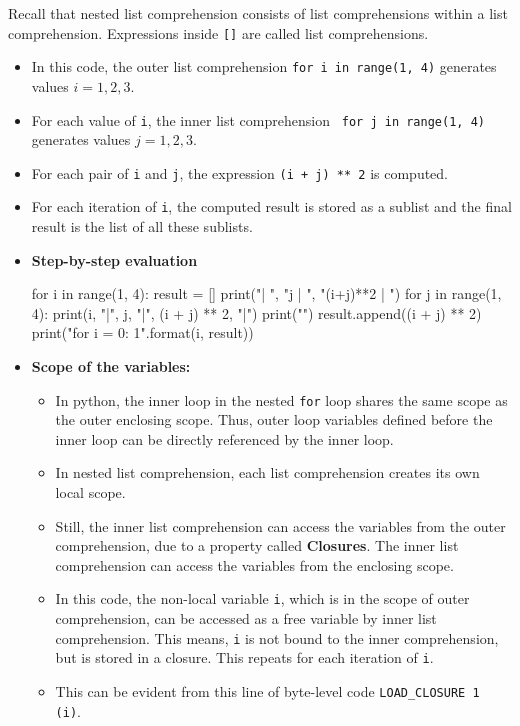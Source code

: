 \documentclass[10pt]{extarticle}
\begin{document}
Recall that nested list comprehension consists of list comprehensions within a list comprehension. Expressions inside \texttt{[]} are called list comprehensions.
\begin{itemize}
    \item In this code, the outer list comprehension \colorbox{gray!20}{\texttt{for i in range(1, 4)}}
    generates values $i = 1,2,3$.
    \item For each value of \texttt{i}, the inner list comprehension \colorbox{gray!20}{\texttt{ for j in range(1, 4)}}
    generates values $j = 1,2,3$.
    \item For each pair of \texttt{i} and \texttt{j}, the expression \colorbox{gray!20}{\texttt{(i + j) ** 2}} is computed.
    \item For each iteration of \texttt{i}, the computed result is stored as a sublist and the final result is the list of all these sublists.
    \item \textbf{Step-by-step evaluation}
    \begin{tcolorbox}[colback=gray!20, colframe=gray!50, sharp corners=southwest]
    \begin{pycode}
for i in range(1, 4):
    result = []
    print("\ni  | ", "j  | ", "(i+j)**2 | \n")
    for j in range(1, 4):
        print(i, "|", j, "|", (i + j) ** 2, "|")
        print("\n")
        result.append((i + j) ** 2)
    print("\nSublist for i = {0}: {1}\n".format(i, result))
    \end{pycode}
    \end{tcolorbox}
    \item \textbf{Scope of the variables:} 
    \begin{itemize}
        \item In python, the inner loop in the nested \texttt{for} loop shares the same scope as the outer enclosing scope. Thus, outer loop variables defined before the inner loop can be directly referenced by the inner loop.   
        \item In nested list comprehension, each list comprehension creates its own local scope. 
        \item Still, the inner list comprehension can access the variables from the outer comprehension, due to a property called \textbf{Closures}. The inner list comprehension can access the variables from the enclosing scope.
        \item In this code, the non-local variable \texttt{i}, which is in the scope of outer comprehension,  can be accessed as a free variable by inner list comprehension. This means, \texttt{i} is not bound to the inner comprehension, but is stored in a closure. This repeats for each iteration of \texttt{i}.
        \item This can be evident from this line of byte-level code  \colorbox{gray!20}{\texttt{LOAD\_CLOSURE 1 (i)}}.
    \end{itemize}
    
\end{itemize} 
\end{document}
